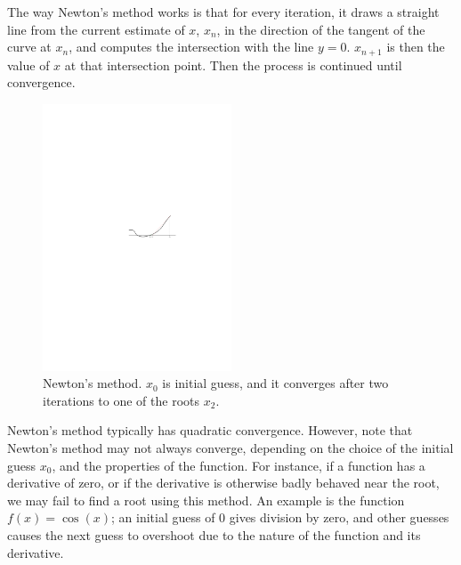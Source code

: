 The way Newton's method works is that for every iteration, it draws a straight line from the current estimate of $x$, $x_n$, in the direction of the tangent of the curve at $x_n$, and computes the intersection with the line $y=0$. $x_{n+1}$ is then the value of $x$ at that intersection point. Then the process is continued until convergence. 

\begin{figure}[ht]
\centering
\includegraphics[width=0.5\textwidth]{figure/newtonsmethod}
\caption{Newton's method. $x_0$ is initial guess, and it converges after two iterations to one of the roots $x_2$.}
\label{fig:newtons_method}
\end{figure}

Newton's method typically has quadratic convergence\cite{newton}. However, note that Newton's method may not always converge, depending on the choice of the initial guess $x_0$, and the properties of the function. For instance, if a function has a derivative of zero, or if the derivative is otherwise badly behaved near the root, we may fail to find a root using this method. An example is the function $f(x)=\cos(x)$; an initial guess of $0$ gives division by zero, and other guesses causes the next guess to overshoot due to the nature of the function and its derivative.

